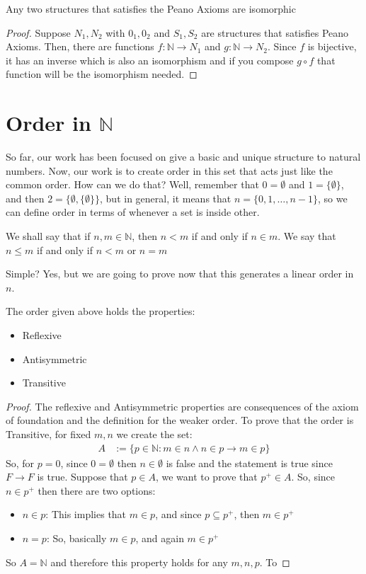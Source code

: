 \documentclass{tufte-handout}
\begin{document}
\begin{corollary}
	Any two structures that satisfies the Peano Axioms are isomorphic
\end{corollary}
\begin{proof}
	Suppose $N_1, N_2$ with $0_1, 0_2$ and $S_1, S_2$ are structures that satisfies Peano Axioms. Then, there are functions $f: \mathbb{N} \to N_1$ and $g: \mathbb{N} \to N_2$. Since $f$ is bijective, it has an inverse which is also an isomorphism and if you compose $g \circ f$ that function will be the isomorphism needed.
\end{proof}

\section{Order in $\mathbb{N}$}
So far, our work has been focused on give a basic and unique structure to natural numbers. Now, our work is to create order in this set that acts just like the common order. How can we do that? Well, remember that $0 = \emptyset$ and $1 = \{\emptyset\}$, and then $2 = \{\emptyset, \{\emptyset\}\}$, but in general, it means that $n = \{0, 1, \dots, n-1\}$, so we can define order in terms of whenever a set is inside other.

\begin{definition}
	We shall say that if $n, m \in \mathbb{N}$, then $n < m$ if and only if $n \in m$. We say that $n \le m$ if and only if $n < m$ or $n = m$
\end{definition}

Simple? Yes, but we are going to prove now that this generates a linear order in $n$.
\begin{theorem}
	The order given above holds the properties:
	\begin{itemize}
		\item Reflexive
		\item Antisymmetric
		\item Transitive
	\end{itemize}
\end{theorem}
\begin{proof}
	The reflexive and Antisymmetric properties are consequences of the axiom of foundation and the definition for the weaker order. To prove that the order is Transitive, for fixed $m, n$ we create the set:
	\begin{align*}
		A &:= \{p \in \mathbb{N}: m \in n \wedge n \in p \rightarrow m \in p\}
	\end{align*}
	So, for $p = 0$, since $0 = \emptyset$ then $n \in \emptyset$ is false and the statement is true since $F \rightarrow F$ is true. Suppose that $p \in A$, we want to prove that $p^+ \in A$. So, since $n \in p^+$ then there are two options:
	\begin{itemize}
		\item $n \in p$: This implies that $m \in p$, and since $p \subseteq p^+$, then $m \in p^+$
		\item $n = p$: So, basically $m \in p$, and again $m \in p^+$
	\end{itemize}
	So $A = \mathbb{N}$ and therefore this property holds for any $m, n, p$. To 
\end{proof}
\end{document}
